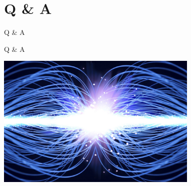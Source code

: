 \section{Q \& A}\label{q-a}

\begin{frame}{Q \& A}

\begin{block}{Q \& A}

\centerline{\includegraphics[width=3.8in]{d.jpg}}

\end{block}

\end{frame}
